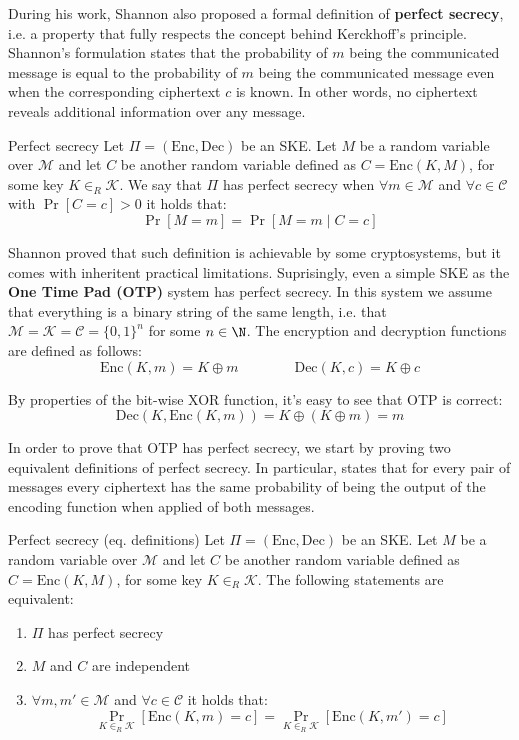 \documentclass[a4paper, 12pt]{report}
\begin{document}
    During his work, Shannon also proposed a formal definition of \textbf{perfect secrecy}, i.e. a property that fully respects the concept behind Kerckhoff's principle. Shannon's formulation states that the probability of $m$ being the communicated message is equal to the probability of $m$ being the communicated message even when the corresponding ciphertext $c$ is known. In other words, no ciphertext reveals additional information over any message.

    \begin{frameddefn}{Perfect secrecy}
        Let $\Pi = (\mathrm{Enc}, \mathrm{Dec})$ be an SKE. Let $M$ be a random variable over $\mathcal{M}$ and let $C$ be another random variable defined as $C = \mathrm{Enc}(K,M)$, for some key $K \in_R \mathcal{K}$. We say that $\Pi$ has perfect secrecy when $\forall m \in \mathcal{M}$ and $\forall c \in \mathcal{C}$ with $\Pr[C = c] > 0$ it holds that:
        \[\Pr[M = m] = \Pr[M = m \mid C = c]\]
    \end{frameddefn}
    
    Shannon proved that such definition is achievable by some cryptosystems, but it comes with inheritent practical limitations. Suprisingly, even a simple SKE as the \textbf{One Time Pad (OTP)} system has perfect secrecy. In this system we assume that everything is a binary string of the same length, i.e. that $\mathcal{M} = \mathcal{K} = \mathcal{C} = \{0,1\}^n$ for some $n \in \N$. The encryption and decryption functions are defined as follows:
    \[\mathrm{Enc}(K, m) = K \oplus m \qquad\qquad \mathrm{Dec}(K,c) = K \oplus c\]
    
    By properties of the bit-wise XOR function, it's easy to see that OTP is correct:
    \[\mathrm{Dec}(K,\mathrm{Enc}(K,m)) = K \oplus (K \oplus m) = m\]

    In order to prove that OTP has perfect secrecy, we start by proving two equivalent definitions of perfect secrecy. In particular, states that for every pair of messages every ciphertext has the same probability of being the output of the encoding function when applied of both messages. 

    \begin{framedlem}[label={perfect_secrecy}]{Perfect secrecy (eq. definitions)}
        Let $\Pi = (\mathrm{Enc}, \mathrm{Dec})$ be an SKE. Let $M$ be a random variable over $\mathcal{M}$ and let $C$ be another random variable defined as $C = \mathrm{Enc}(K,M)$, for some key $K \in_R \mathcal{K}$. The following statements are equivalent:
        \begin{enumerate}
            \item $\Pi$ has perfect secrecy
            \item $M$ and $C$ are independent
            \item $\forall m, m' \in \mathcal{M}$ and $\forall c \in \mathcal{C}$ it holds that:
            \[\Pr_{K \in_R \mathcal{K}}[\mathrm{Enc}(K,m) = c] = \Pr_{K \in_R \mathcal{K}}[\mathrm{Enc}(K,m') = c]\]
        \end{enumerate}
    \end{framedlem}
\end{document}
